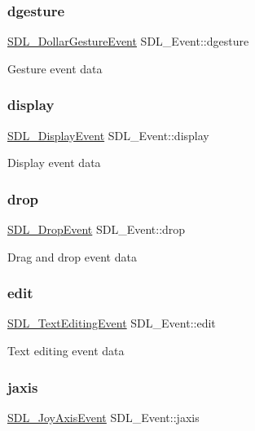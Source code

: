 \subsubsection{\texorpdfstring{dgesture}{dgesture}}
{\footnotesize\ttfamily \mbox{\hyperlink{struct_s_d_l___dollar_gesture_event}{S\+D\+L\+\_\+\+Dollar\+Gesture\+Event}} S\+D\+L\+\_\+\+Event\+::dgesture}

Gesture event data \mbox{\label{union_s_d_l___event_afe513d46e191a9791988b9adab705ef6}} 
\subsubsection{\texorpdfstring{display}{display}}
{\footnotesize\ttfamily \mbox{\hyperlink{struct_s_d_l___display_event}{S\+D\+L\+\_\+\+Display\+Event}} S\+D\+L\+\_\+\+Event\+::display}

Display event data \mbox{\label{union_s_d_l___event_acff77bccbca65abbb876360a3f5209c9}} 
\subsubsection{\texorpdfstring{drop}{drop}}
{\footnotesize\ttfamily \mbox{\hyperlink{struct_s_d_l___drop_event}{S\+D\+L\+\_\+\+Drop\+Event}} S\+D\+L\+\_\+\+Event\+::drop}

Drag and drop event data \mbox{\label{union_s_d_l___event_a9a7e3b67b2654d4c5fc509676c6a7183}} 
\subsubsection{\texorpdfstring{edit}{edit}}
{\footnotesize\ttfamily \mbox{\hyperlink{struct_s_d_l___text_editing_event}{S\+D\+L\+\_\+\+Text\+Editing\+Event}} S\+D\+L\+\_\+\+Event\+::edit}

Text editing event data \mbox{\label{union_s_d_l___event_ac4611acd0e9c675e67dc20919f0accb4}} 
\subsubsection{\texorpdfstring{jaxis}{jaxis}}
{\footnotesize\ttfamily \mbox{\hyperlink{struct_s_d_l___joy_axis_event}{S\+D\+L\+\_\+\+Joy\+Axis\+Event}} S\+D\+L\+\_\+\+Event\+::jaxis}


